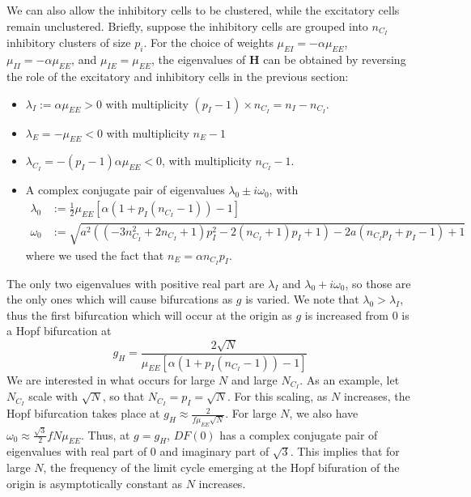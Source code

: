\documentclass[11pt,reqno]{amsart}
\newcommand{\Hvec}{\mathbf{H}}
\begin{document}
We can also allow the inhibitory cells to be clustered, while the excitatory cells remain unclustered. Briefly, suppose the inhibitory cells are grouped into $n_{C_I}$ inhibitory clusters of size $p_i$. For the choice of weights $\mu_{EI} = -\alpha \mu_{EE}$, $\mu_{II} = -\alpha \mu_{EE}$, and $\mu_{IE} = \mu_{EE}$, the eigenvalues of $\Hvec$ can be obtained by reversing the role of the excitatory and inhibitory cells in the previous section:
\begin{itemize}
\item $\lambda_I := \alpha \mu_{EE} > 0$ with multiplicity $(p_I-1) \times n_{C_I} = n_I - n_{C_I}$.
\item $\lambda_E = -\mu_{EE} < 0$ with multiplicity $n_E - 1$
\item $\lambda_{C_I} = -(p_I-1)\alpha \mu_{EE} < 0$, with multiplicity $n_{C_I}-1$.
\item A complex conjugate pair of eigenvalues $\lambda_0 \pm i \omega_0$, with 
\begin{align*}
    \lambda_0 &:= \frac{1}{2}\mu_{EE} \left[ \alpha( 1 + p_I(n_{C_I}-1)) -1 \right]
      \\
    \omega_0 &:= \sqrt{a^2 \left(\left(-3 n_{C_I}^2+2 n_{C_I}+1\right) p_I^2-2 (n_{C_I}+1) p_I+1\right)-2 a
    (n_{C_I}p_I +p_I -1)+1}
\end{align*}
where we used the fact that $n_E = \alpha n_{C_I} p_I$.
\end{itemize}
The only two eigenvalues with positive real part are $\lambda_I$ and $\lambda_0 + i \omega_0$, so those are the only ones which will cause bifurcations as $g$ is varied. We note that $\lambda_0 > \lambda_I$, thus the first bifurcation which will occur at the origin as $g$ is increased from 0 is a Hopf bifurcation at 
\[
g_H = \frac{2 \sqrt{N}}{\mu_{EE} \left[ \alpha( 1 + p_I(n_{C_I}-1)) -1 \right] }
\]
We are interested in what occurs for large $N$ and large $N_{C_I}$. As an example, let $N_{C_I}$ scale with $\sqrt{N}$, so that $N_{C_I} = p_I = \sqrt{N}$. For this scaling, as $N$ increases, the Hopf bifurcation takes place at $g_H \approx \frac{2}{f \mu_{EE} \sqrt{N}}$. For large $N$, we also have $\omega_0 \approx \frac{\sqrt{3}}{2}f N \mu_{EE}$. Thus, at $g = g_H$, $DF(0)$ has a complex conjugate pair of eigenvalues with real part of 0 and imaginary part of $\sqrt{3}$. This implies that for large $N$, the frequency of the limit cycle emerging at the Hopf bifuration of the origin is asymptotically constant as $N$ increases.
\end{document}
